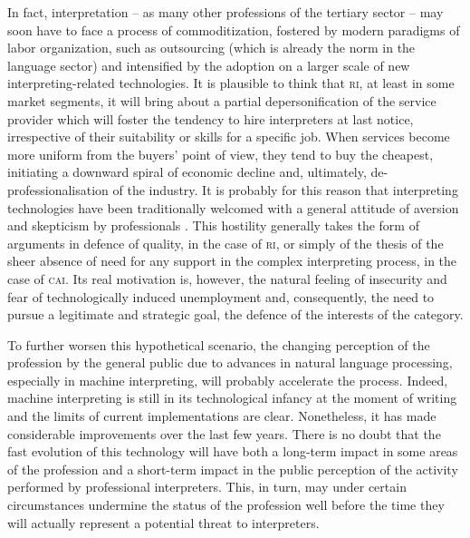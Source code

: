 \documentclass[output=paper]{langsci/langscibook}
\begin{document}
In fact, interpretation – as many other professions of the tertiary sector – may soon have to face a process of commoditization, fostered by modern paradigms of labor organization, such as outsourcing (which is already the norm in the language sector) and intensified by the adoption on a larger scale of new interpreting-related technologies. It is plausible to think that \textsc{ri}, at least in some market segments, it will bring about a partial depersonification of the service provider which will foster the tendency to hire interpreters at last notice, irrespective of their suitability or skills for a specific job. When services become more uniform from the buyers’ point of view, they tend to buy the cheapest, initiating a downward spiral of economic decline and, ultimately, de-professionalisation of the industry. It is probably for this reason that interpreting technologies have been traditionally welcomed with a general attitude of aversion and skepticism by professionals \citep{pym_what_2011}. This hostility generally takes the form of arguments in defence of quality, in the case of \textsc{ri}, or simply of the thesis of the sheer absence of need for any support in the complex interpreting process, in the case of \textsc{cai}. Its real motivation is, however, the natural feeling of insecurity and fear of technologically induced unemployment and, consequently, the need to pursue a legitimate and strategic goal, the defence of the interests of the category.  
 
To further worsen this hypothetical scenario, the changing perception of the profession by the general public due to advances in natural language processing, especially in machine interpreting, will probably accelerate the process. Indeed, machine interpreting is still in its technological infancy at the moment of writing and the limits of current implementations are clear. Nonetheless, it has made considerable improvements over the last few years. There is no doubt that the fast evolution of this technology will have both a long-term impact in some areas of the profession and a short-term impact in the public perception of the activity performed by professional interpreters. This, in turn, may under certain circumstances undermine the status of the profession well before the time they will actually represent a potential threat to interpreters. 
 
\end{document}

